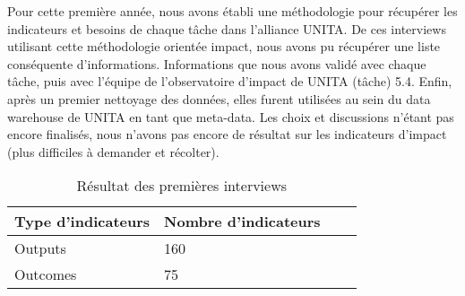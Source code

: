 Pour cette première année, nous avons établi une méthodologie pour récupérer les indicateurs et besoins de chaque tâche dans l'alliance UNITA. De ces interviews utilisant cette méthodologie orientée impact, nous avons pu récupérer une liste conséquente d'informations. Informations que nous avons validé avec chaque tâche, puis avec l'équipe de l'observatoire d'impact de UNITA (tâche) 5.4. Enfin, après un premier nettoyage des données, elles furent utilisées au sein du data warehouse de UNITA en tant que meta-data. Les choix et discussions n'étant pas encore finalisés, nous n'avons pas encore de résultat sur les indicateurs d'impact (plus difficiles à demander et récolter). 
\begin{table}[h]
  \caption{Résultat des premières interviews}
  \begin{center}
    \begin{tabular}{|l|l|l|l|} \hline
    \textbf{Type d'indicateurs} & \textbf{Nombre d'indicateurs} \\ \hline
    Outputs & 160 \\ \hline
    Outcomes & 75 \\ \hline
    \end{tabular}
  \end{center}
\end{table}